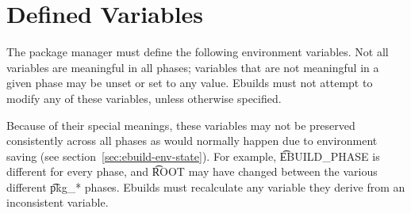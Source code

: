 \section{Defined Variables}
\label{sec:ebuild-env-vars}

The package manager must define the following environment variables. Not all variables are
meaningful in all phases; variables that are not meaningful in a given phase may be unset or set to
any value. Ebuilds must not attempt to modify any of these variables, unless otherwise specified.

Because of their special meanings, these variables may not be preserved consistently across all
phases as would normally happen due to environment saving (see section~\ref{sec:ebuild-env-state}).
For example, \t{EBUILD_PHASE} is different for every phase, and \t{ROOT} may have changed between
the various different \t{pkg_*} phases. Ebuilds must recalculate any variable they derive from an
inconsistent variable.

